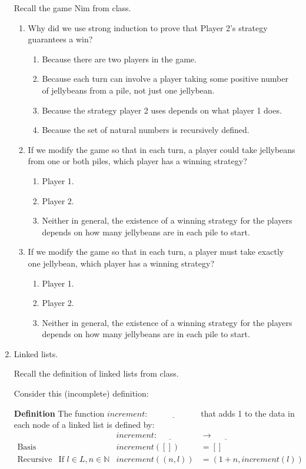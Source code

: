 \documentclass[12pt, oneside]{article}
\begin{document}
\begin{enumerate}
Recall the game Nim from class.

\begin{enumerate}
    \item Why did we use strong induction to prove that Player 2's strategy guarantees a win?
    \begin{enumerate}
        \item Because there are two players in the game.
        \item Because each turn can involve a player taking some positive number 
        of jellybeans from a pile, not just one jellybean.
        \item Because the strategy player 2 uses depends on what player 1 does.
        \item Because the set of natural numbers is recursively defined.
    \end{enumerate}
    \item  If we modify the game so that in each turn, a player could take jellybeans
    from one or both piles, which player has a winning strategy?
    \begin{enumerate}
        \item Player 1.
        \item Player 2.
        \item Neither in general, the existence of a winning strategy for the players depends 
        on how many jellybeans are in each pile to start.
    \end{enumerate}
    \item  If we modify the game so that in each turn, a player must take 
    exactly one jellybean, which player has a winning strategy?
    \begin{enumerate}
        \item Player 1.
        \item Player 2.
        \item Neither in general, the existence of a winning strategy for the players depends 
        on how many jellybeans are in each pile to start.
    \end{enumerate}
\end{enumerate}
     \item Linked lists. 

Recall the definition of linked lists from class.

Consider this (incomplete) definition:

{\bf Definition} The function $\textit{increment} : \underline{\hspace{6em}}$ 
that adds 1 to the data in each node of a linked list is defined by:
\[
\begin{array}{llll}
& & \textit{increment} : \underline{\hspace{3em}} & \to \underline{\hspace{3em}} \\
\textrm{Basis Step:} & & \textit{increment}([]) & = [] \\
\textrm{Recursive Step:} & \textrm{If } l \in L, n \in \mathbb{N} & \textit{increment}((n, l)) & = (1 + n, \textit{increment}(l))
\end{array}
\]


\end{enumerate}
\end{document}
